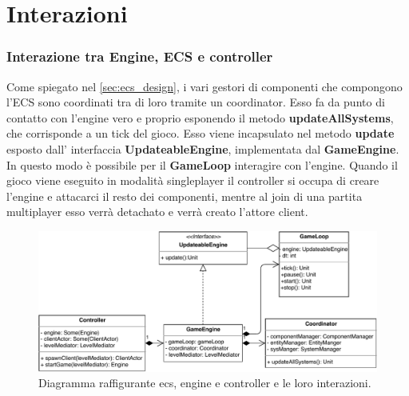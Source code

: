\section{Interazioni}
\label{sec:interactions_design}

\subsubsection{Interazione tra Engine, ECS e controller}
Come spiegato nel \ref{sec:ecs_design}, i vari gestori di componenti che compongono l'ECS sono coordinati tra di loro tramite un coordinator. Esso fa da punto di contatto con l'engine vero e proprio esponendo il metodo \textbf{updateAllSystems}, che corrisponde a un tick del gioco. Esso viene incapsulato nel metodo \textbf{update} esposto dall' interfaccia \textbf{UpdateableEngine}, implementata dal \textbf{GameEngine}. In questo modo è possibile per il \textbf{GameLoop} interagire con l'engine.
Quando il gioco viene eseguito in modalità singleplayer il controller si occupa di creare l'engine e attacarci il resto dei componenti, mentre al join di una partita multiplayer esso verrà detachato e verrà creato l'attore client.
\begin{figure}[H]
	\centering
	\includegraphics[width=\columnwidth]{drawio/ECS-engine-controller/ecs-engine-controller.pdf}
	\caption{Diagramma raffigurante ecs, engine e controller e le loro interazioni.}
	\label{fig:ecsenginecontroller}
\end{figure}
